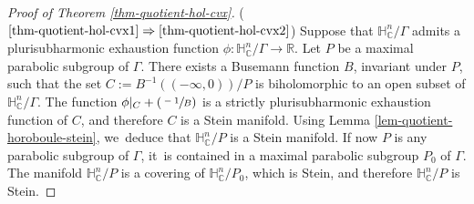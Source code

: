 \documentclass[11pt]{article}
\newcommand{\skpt}{\smallskip}
\newcommand{\Psfrac}[2]{(\sfrac{#1}{#2})}
\theoremstyle{definition}
\newcommand{\C}{\mathbb{C}}
\newcommand{\R}{\mathbb{R}}
\newcommand{\HNC}{\mathbb{H}^{n}_{\C}}
\def\C{\mathbb{C}}
\newcommand{\HNC}{\mathbb{H}^{n}_{\C}}
\begin{document}
\skpt
\begin{proof}[Proof of Theorem \ref{thm-quotient-hol-cvx}]
($\eqref{thm-quotient-hol-cvx1}\Rightarrow\eqref{thm-quotient-hol-cvx2}$) Suppose that $\HNC/\Gamma$ admits a plurisubharmonic exhaustion function $\phi:\HNC/\Gamma\to \R$. Let $P$ be a maximal parabolic subgroup of $\Gamma$. There exists a Busemann function $B$, invariant under $P$, such that the set $C:=B^{-1}((-\infty,0))/P$ is biholomorphic to an open subset of $\HNC/\Gamma$. The function $\phi\vert_{ C} + \Psfrac{-1}{B}$ is a strictly plurisubharmonic exhaustion function of $C$, and therefore $C$ is a Stein manifold. Using Lemma \ref{lem-quotient-horoboule-stein}, we~deduce that $\HNC/P$ is a Stein manifold. If now $P$ is any parabolic subgroup of $\Gamma$, it~is contained in a maximal parabolic subgroup $P_0$ of $\Gamma$. The manifold $\HNC/P$ is a covering of $\HNC/P_0$, which is Stein, and therefore $\HNC/P$ is Stein.


\end{proof}
\end{document}
